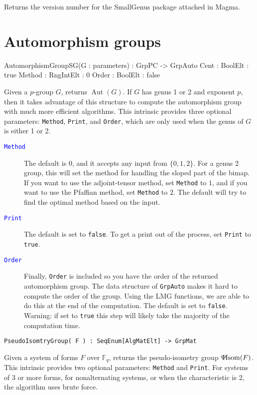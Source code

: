 \documentclass{documentation}
\DeclareMathOperator{\Aut}{Aut}
\DeclareMathOperator{\isom}{Isom}
\newcommand{\pseudo}{\Psi\hspace*{-1mm}\isom}
\begin{document}
Returns the version number for the SmallGenus package attached in Magma.


\chapter{Automorphism groups}

\begin{intrinsics}
AutomorphismGroupSG(G : parameters) : GrpPC -> GrpAuto
    Cent : BoolElt : true
    Method : RngIntElt : 0 
    Order : BoolElt : false
\end{intrinsics}

\color{black}
Given a $p$-group $G$, returns $\Aut(G)$.
If $G$ has genus 1 or 2 and exponent $p$, then it takes advantage of this structure 
to compute the automorphism group with much more efficient algorithms.
This intrinsic provides three optional parameters: {\tt Method}, {\tt Print}, and {\tt Order}, 
which are only used when the genus of $G$ is either 1 or 2.

\begin{description}
\item[\textcolor{blue}{\tt Method}]
The default is $0$, and it accepts any input from $\{ 0,1,2\}$. 
For a genus 2 group, this will set the method for handling the sloped part of the bimap.
If you want to use the adjoint-tensor method, set {\tt Method} to $1$, and if you want to use the Pfaffian
method, set {\tt Method} to $2$. The default will try to find the optimal method based on the input. 
\item[\textcolor{blue}{\tt Print}]
The default is set to {\tt false}. To get a print out of the process, set {\tt Print} to {\tt true}. 
\item[\textcolor{blue}{\tt Order}]
Finally, {\tt Order} is included so you have the order of the returned automorphism group. The data structure of {\tt GrpAuto} makes it hard to compute the order of the group. Using the LMG functions, we are able to do this at the end of the computation. The default is set to {\tt false}. Warning: if set to {\tt true} this step will likely take the majority of the computation time.
\end{description}

\color{blue}
\begin{verbatim}
PseudoIsomtryGroup( F ) : SeqEnum[AlgMatElt] -> GrpMat
\end{verbatim}

\color{black}
Given a system of forms $F$ over $\mathbb{F}_q$, returns the pseudo-isometry group $\pseudo(F)$.
This intrinsic provides two optional parameters: {\tt Method} and {\tt Print}. 
For systems of 3 or more forms, for nonalternating systems, or when the characteristic is 2, the algorithm uses brute force. 
\end{document}
